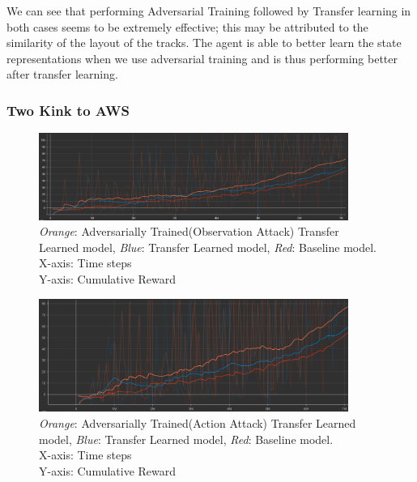We can see that performing Adversarial Training followed by Transfer learning in both cases seems to be extremely effective; this may be attributed to the similarity of the layout of the tracks. The agent is able to better learn the state representations when we use adversarial training and is thus performing better after transfer learning.


\subsubsection{Two Kink to AWS }

\begin{figure}[H]
    \centering
    \includegraphics[width=0.9\textwidth]{images/graphs/AT-TL-TwoKink-AWSTrack-0.98.png}
    \caption{\centering \textit{Orange}: Adversarially Trained(Observation Attack) Transfer Learned model, \textit{Blue}: Transfer Learned model, \textit{Red}: Baseline model. \\ X-axis: Time steps \\ Y-axis: Cumulative Reward }
   
    
    \label{fig:my_label}
\end{figure}



\begin{figure}[H]
    \centering
    \includegraphics[width=0.9\textwidth]{images/graphs/AAT2-TL-TwoKink-AWS.png}
    \caption{\centering \textit{Orange}: Adversarially Trained(Action Attack) Transfer Learned model, \textit{Blue}: Transfer Learned model, \textit{Red}: Baseline model. \\ X-axis: Time steps \\ Y-axis: Cumulative Reward }
   
    
    \label{fig:my_label}
\end{figure}

